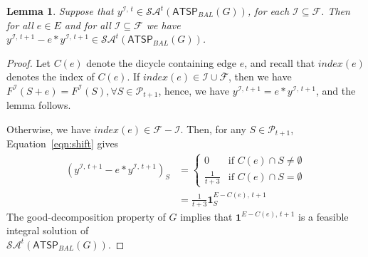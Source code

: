 \documentclass[11pt]{article}
\newtheorem{lemma}[theorem]{Lemma}
\newcommand{\pop}{\mathcal{P}}
\newcommand{\atspbal}{\homog{\textsf{ATSP$_{\mathit{BAL}}$}}}
\newcommand{\fracset}{\mathcal{F}}
\newcommand{\notfracset}{\overline{\mathcal{F}}}
\newcommand{\sgn}{\mathcal{I}}
\newcommand{\yvec}[2]{y^{#1,\,#2}}	\newcommand{\zvec}[2]{y^{#1,\,#2}}	\newcommand{\zveconly}{y}
\newcommand{\onevec}[2]{\textbf{1}^{#1,\,#2}}		\newcommand{\goodfrac}[2]{F^{#1}(#2)}	\newcommand{\szgoodfrac}[2]{f^{#1}(#2)}	\newcommand{\cindex}[1]{\textit{index}(#1)} \newcommand{\indfrac}{h}	\newcommand{\tour}{\textit{tour\/}}
\newcommand{\saop}{\mathcal{SA}}
\newcommand{\homog}[1]{{#1}}
\begin{document}
\begin{lemma}
\label{lemma:cond2}
Suppose that $\yvec{\sgn}{t} \in \saop^t(\homog{\atspbal(G)})$,
for each $\sgn\subseteq\fracset$.
Then for all $e \in E$ and for all $\sgn\subseteq\fracset$ we have
$\yvec{\sgn}{t+1} - e*\yvec{\sgn}{t+1}  \in \saop^t(\homog{\atspbal(G)})$.
\end{lemma}

\begin{proof}
Let $C(e)$ denote the dicycle containing edge $e$, and recall
that $\cindex{e}$ denotes the index of $C(e)$.
If $\cindex{e}\in \sgn\cup\notfracset$,
then we have $\goodfrac{\sgn}{S+e} = \goodfrac{\sgn}{S}, \forall S\in\pop_{t+1}$,
hence, we have $\yvec{\sgn}{t+1} = e*\yvec{\sgn}{t+1}$, and
the lemma follows.

Otherwise, we have $\cindex{e}\in \fracset-\sgn$.
Then, for any $S\in\pop_{t+1}$, Equation~\eqref{eqn:shift} gives
\begin{align}
 (\yvec{\sgn}{t+1} - e*\yvec{\sgn}{t+1})_S &=
 \begin{cases}
  0 &\text{if } C(e)\cap S\neq \emptyset \\
  \frac{1}{t+3}  &\text{if } C(e)\cap S=\emptyset
 \end{cases}\\
 &= \frac{1}{t+3}\onevec{E-C(e)}{t+1}_S
\end{align}
The good-decomposition property of $G$ implies that
$\onevec{E-C(e)}{t+1}$ is
a feasible integral solution of \\ $\saop^t(\atspbal(G))$.
\end{proof}
\end{document}

